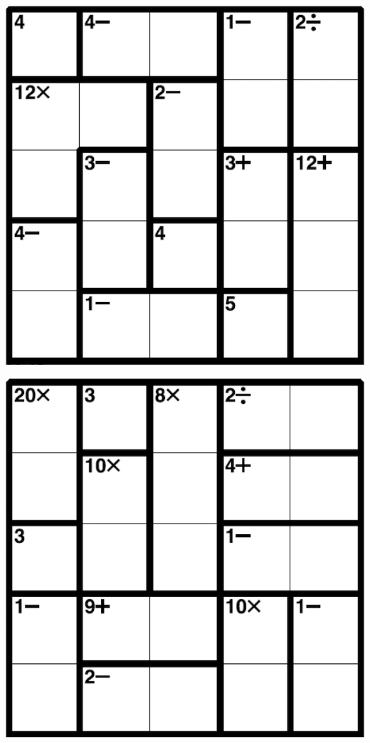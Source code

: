 
\includegraphics[scale=1]{Gambar/Lampiran/5x5_21.png}

\includegraphics[scale=1]{Gambar/Lampiran/5x5_22.png}
